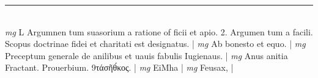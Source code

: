 \documentclass{article}
\begin{document}
\begin{pages}
\vspace{0.5cm}\noindent
\vspace{0.2cm}\rule{1cm}{0.2pt}\\ 
\hspace{0.2cm}\textit{mg}
\footnotesize L Argumnen tum suasorium a ratione of ficii et apio. 2. Argumen tum a facili. Scopus doctrinae fidei et charitati est designatus. 
\normalsize| 
\hspace{0.2cm}\textit{mg}
\footnotesize Ab bonesto et equo. 
\normalsize| 
\hspace{0.2cm}\textit{mg}
\footnotesize Preceptum generale de anilibus et uauis fabulis Iugienaus. 
\normalsize| 
\hspace{0.2cm}\textit{mg}
\footnotesize Anus anitia Fractant. Prouerbium. 9τάσῆθ́κος. 
\normalsize| 
\hspace{0.2cm}\textit{mg}
\footnotesize EiMha
\normalsize| 
\hspace{0.2cm}\textit{mg}
\footnotesize Feusax, 
\normalsize| 

\end{pages}
\end{document}
